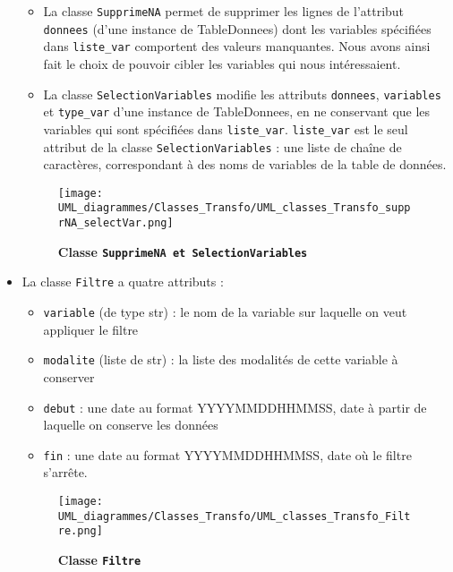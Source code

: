 \documentclass[11pt]{article}
\begin{document}
\begin{itemize}
    \begin{itemize}[label=, font=\small]
        \item La classe \texttt{SupprimeNA} permet de supprimer les lignes de l'attribut \texttt{donnees} (d'une instance de TableDonnees) dont les variables spécifiées dans \texttt{liste\_var} comportent des valeurs manquantes. Nous avons ainsi fait le choix de pouvoir cibler les variables qui nous intéressaient.
        \item La classe \texttt{SelectionVariables} modifie les attributs \texttt{donnees}, \texttt{variables} et \texttt{type\_var} d'une instance de TableDonnees, en ne conservant que les variables qui sont spécifiées dans  \texttt{liste\_var}. \texttt{liste\_var} est le seul attribut de la classe \texttt{SelectionVariables} : une liste de chaîne de caractères, correspondant à des noms de variables de la table de données.
    \end{itemize}
    
    \begin{figure}[H]
    \caption{\textbf{Classe \texttt{SupprimeNA et SelectionVariables}}}
    \label{UML_classe_supprNA_SelectVar}
    \centering
    \texttt{[image: UML\_diagrammes/Classes\_Transfo/UML\_classes\_Transfo\_supprNA\_selectVar.png]}
    \end{figure}
    
    
    \item La classe \texttt{Filtre} a quatre attributs :
    \begin{itemize}[label=, font=\small]
        \item \texttt{variable} (de type str) : le nom de la variable sur laquelle on veut appliquer le filtre
        \item \texttt{modalite} (liste de str) : la liste des modalités de cette variable à conserver
        \item \texttt{debut} : une date au format YYYYMMDDHHMMSS, date à partir de laquelle on conserve les données
        \item \texttt{fin} : une date au format YYYYMMDDHHMMSS, date où le filtre s'arrête.
    \end{itemize}
    
    \begin{figure}[H]
    \caption{\textbf{Classe \texttt{Filtre}}}
    \label{UML_classe_Filtre}
    \centering
    \texttt{[image: UML\_diagrammes/Classes\_Transfo/UML\_classes\_Transfo\_Filtre.png]}
    \end{figure}
    

\end{itemize}
\end{document}
